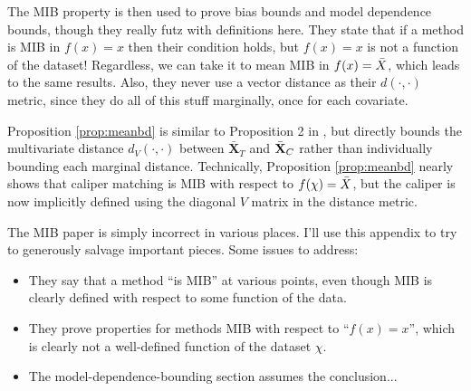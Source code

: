 \documentclass{article}
\newcommand{\bX}{\mathbf{X}}
\begin{document}
The MIB property is then used to prove bias bounds and model dependence bounds, though they really futz with definitions here.
They state that if a method is MIB in $f(x) = x$ then their condition holds, but $f(x)=x$ is not a function of the dataset!
Regardless, we can take it to mean MIB in $f(x) = \Bar{X}$, which leads to the same results.
Also, they never use a vector distance as their $d(\cdot, \cdot)$ metric, since they do all of this stuff marginally, once for each covariate.


Proposition \ref{prop:meanbd} is similar to Proposition 2 in \citet{iacus2011multivariate}, but directly bounds the multivariate distance $d_V(\cdot,\cdot)$ between $\bar{\bX}_T$ and $\Bar{\bX}_C$ rather than individually bounding each marginal distance.
Technically, Proposition \ref{prop:meanbd} nearly shows that caliper matching is MIB with respect to $f(\chi)=\Bar{X}$, but the caliper is now implicitly defined using the diagonal $V$ matrix in the distance metric.


The MIB paper is simply incorrect in various places.
I'll use this appendix to try to generously salvage important pieces.
Some issues to address:
\begin{itemize}
    \item They say that a method ``is MIB'' at various points, even though MIB is clearly defined with respect to some function of the data.
    \item They prove properties for methods MIB with respect to ``$f(x)=x$'', which is clearly not a well-defined function of the dataset $\chi$.
    \item The model-dependence-bounding section assumes the conclusion...
\end{itemize}


\end{document}
